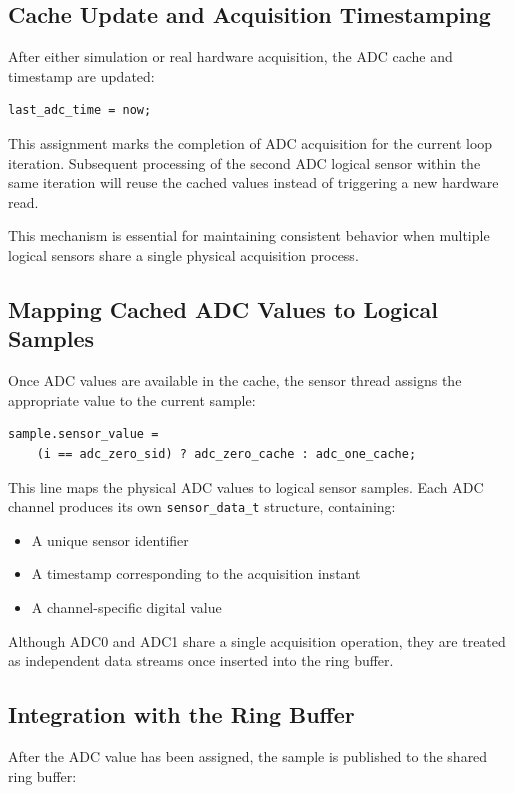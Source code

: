 \subsection{Cache Update and Acquisition Timestamping}
After either simulation or real hardware acquisition, the ADC cache and timestamp are updated:

\begin{verbatim}
last_adc_time = now;
\end{verbatim}
This assignment marks the completion of ADC acquisition for the current loop iteration. Subsequent processing of the second ADC logical sensor within the same iteration will reuse the cached values instead of triggering a new hardware read.

This mechanism is essential for maintaining consistent behavior when multiple logical sensors share a single physical acquisition process.

\subsection{Mapping Cached ADC Values to Logical Samples}
Once ADC values are available in the cache, the sensor thread assigns the appropriate value to the current sample:

\begin{verbatim}
sample.sensor_value =
    (i == adc_zero_sid) ? adc_zero_cache : adc_one_cache;
\end{verbatim}
This line maps the physical ADC values to logical sensor samples. Each ADC channel produces its own \texttt{sensor\_data\_t} structure, containing:

\begin{itemize}
    \item A unique sensor identifier
    \item A timestamp corresponding to the acquisition instant
    \item A channel-specific digital value
\end{itemize}
Although ADC0 and ADC1 share a single acquisition operation, they are treated as independent data streams once inserted into the ring buffer.

\subsection{Integration with the Ring Buffer}
After the ADC value has been assigned, the sample is published to the shared ring buffer:

